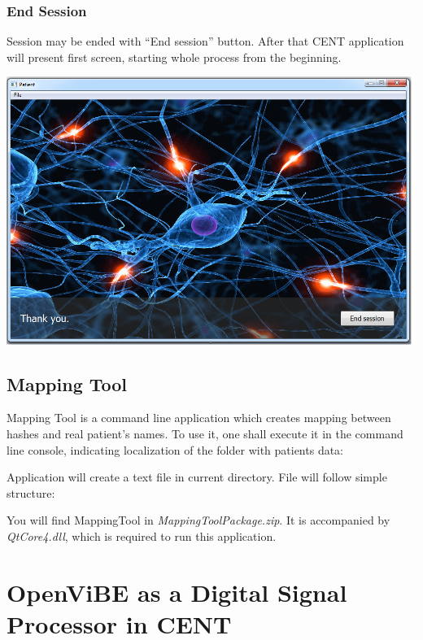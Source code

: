\documentclass[letterpaper,10pt,english]{sphinxmanual}
\begin{document}
\subsubsection{End Session}
\label{index:end-session}
Session may be ended with ``End session'' button. After that CENT application will present first screen, starting whole process from the beginning.

{\hfill\includegraphics{EndSession.PNG}\hfill}


\subsection{\textbf{Mapping Tool}}
\label{index:id2}\label{index:mapping-tool}
Mapping Tool is a command line application which creates mapping between hashes and real patient's names. To use it, one shall execute  it in the command line console, indicating localization of the folder with patients data:
\begin{quote}

\end{quote}

Application will create a text file in current directory. File will follow simple structure:
\begin{quote}

\end{quote}

You will find MappingTool in \emph{MappingToolPackage.zip}. It is accompanied by \emph{QtCore4.dll}, which is required to run this application.


\section{\textbf{OpenViBE as a Digital Signal Processor in CENT}}
\label{index:openvibe-as-a-digital-signal-processor-in-cent}
\end{document}
